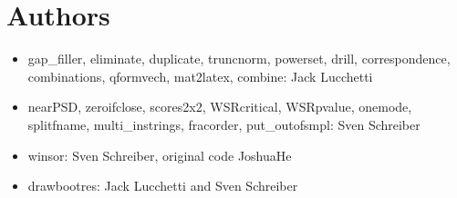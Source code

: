 \documentclass[11pt,english]{article}
\begin{document}
\section{Authors}
\begin{itemize}
\item gap\_filler, eliminate, duplicate, truncnorm, powerset, drill,
  correspondence, combinations, qformvech, mat2latex, combine: Jack
  Lucchetti

\item nearPSD, zeroifclose, scores2x2, WSRcritical, WSRpvalue, onemode,
splitfname, multi\_instrings, fracorder, put\_outofsmpl:
Sven Schreiber

\item winsor: Sven Schreiber, original code JoshuaHe

\item drawbootres: Jack Lucchetti and Sven Schreiber

\end{itemize}
\end{document}
